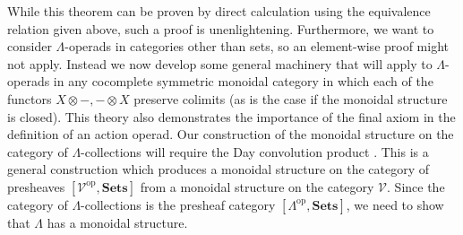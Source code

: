 \documentclass{amsbook} %
\newcommand{\mb}{\mathbf}
\numberwithin{section}{chapter}
\begin{document}
While this theorem can be proven by direct calculation using the equivalence relation given above, such a proof is unenlightening.  Furthermore, we want to consider $\Lambda$-operads in categories other than sets, so an element-wise proof might not apply.  Instead we now develop some general machinery that will apply to $\Lambda$-operads in any cocomplete symmetric monoidal category in which each of  the functors $X \otimes -, - \otimes X$ preserve colimits (as is the case if the monoidal structure is closed).  This theory also demonstrates the importance of the final axiom in the definition of an action operad.  Our construction of the monoidal structure on the category of $\Lambda$-collections will require the Day convolution product \cite{day-thesis}.  This is a general construction which produces a monoidal structure on the category of presheaves $[\mathcal{V}^{\textrm{op}}, \mb{Sets}]$ from a monoidal structure on the category $\mathcal{V}$.  Since the category of $\Lambda$-collections is the presheaf category $[\mathbb{\Lambda}^{\textrm{op}}, \mb{Sets}]$, we need to show that $\mathbb{\Lambda}$ has a monoidal structure.
\end{document}
